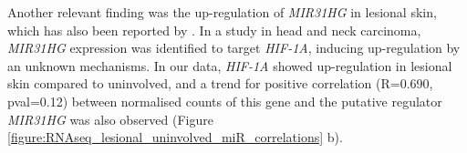 


Another relevant finding was the up-regulation of \textit{MIR31HG} in lesional skin, which has also been reported by \parencite{Tsoi2015}. In a study in head and neck carcinoma, \textit{MIR31HG} expression was identified to target \textit{HIF-1A}, inducing up-regulation by an unknown mechanisms. In our data, \textit{HIF-1A} showed up-regulation in lesional skin compared to uninvolved, and a trend for positive correlation (R=0.690, pval=0.12) between normalised counts of this gene and the putative regulator \textit{MIR31HG} was also observed (Figure \ref{figure:RNAseq_lesional_uninvolved_miR_correlations} b).





